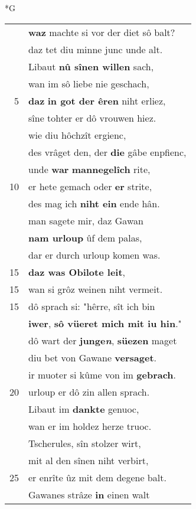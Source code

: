\documentclass[8pt,a4paper,notitlepage]{article}
\begin{document}
\newpage
\begin{table}[ht]
\begin{minipage}[t]{0.5\linewidth}
\small
\begin{center}*G
\end{center}
\begin{tabular}{rl}
 & \textbf{waz} machte si vor der diet sô balt?\\ 
 & daz tet diu minne junc unde alt.\\ 
 & Libaut \textbf{nû sînen willen} sach,\\ 
 & wan im sô liebe nie geschach,\\ 
5 & \textbf{daz} \textbf{in got der êren} niht erliez,\\ 
 & sîne tohter er dô vrouwen hiez.\\ 
 & wie diu hôchzît ergienc,\\ 
 & des vrâget den, der \textbf{die} gâbe enpfienc,\\ 
 & unde \textbf{war} \textbf{mannegelîch} rite,\\ 
10 & er hete gemach oder \textbf{er} strite,\\ 
 & des mag ich \textbf{niht ein} ende hân.\\ 
 & man sagete mir, daz Gawan\\ 
 & \textbf{nam urloup} ûf dem palas,\\ 
 & dar er durch urloup komen was.\\ 
15 & \textbf{daz was Obilote leit},\\ 
15 & wan si grôz weinen niht vermeit.\\ 
15 & dô sprach si: "hêrre, sît ich bin\\ 
 & \textbf{iwer}, \textbf{sô vüeret mich mit iu hin}."\\ 
 & dô wart der \textbf{junge\textit{n}}, \textbf{süezen} maget\\ 
 & diu bet von Gawane \textbf{versaget}.\\ 
 & ir muoter si kûme von im \textbf{gebrach}.\\ 
20 & urloup er dô zin allen sprach.\\ 
 & Libaut im \textbf{dankte} genuoc,\\ 
 & wan er im holdez herze truoc.\\ 
 & Tscherules, sîn stolzer wirt,\\ 
 & mit al den sînen niht verbirt,\\ 
25 & er enrîte ûz mit dem degene balt.\\ 
 & Gawanes strâze \textbf{in} einen walt\\ 

\end{tabular}
\end{minipage}
\end{table}
\end{document}
